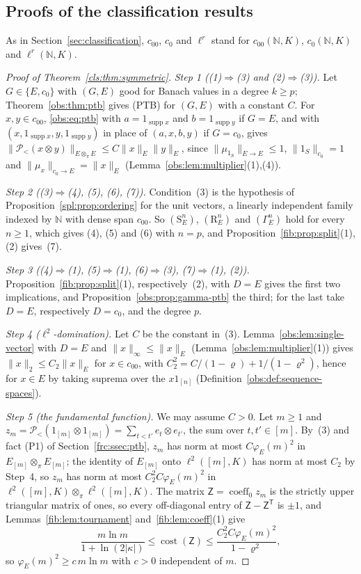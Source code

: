 \documentclass[11pt]{amsart}
\theoremstyle{definition}
\theoremstyle{remark}
\numberwithin{equation}{section}
\newcommand{\N}{\mathbb N}
\newcommand{\abs}[1]{\lvert #1\rvert}
\newcommand{\norm}[1]{\lVert #1\rVert}
\newcommand{\coeff}{\operatorname{coeff}}
\theoremstyle{plain}
\theoremstyle{definition}
\theoremstyle{plain}
\newcommand{\cP}{\mathcal P}
\begin{document}
\subsection{Proofs of the classification results}\label{frc:ssec:classification}
As in Section~\ref{sec:classification}, $c_{00}$, $c_0$ and $\ell^r$ stand for $c_{00}(\N,K)$, $c_0(\N,K)$ and
$\ell^r(\N,K)$.

\begin{proof}[Proof of Theorem~\ref{cls:thm:symmetric}]
\emph{Step 1 ((1)$\Rightarrow$(3) and (2)$\Rightarrow$(3)).} Let $G\in\{E,c_0\}$ with $(G,E)$ good for Banach values in
a degree $k\ge p$; Theorem~\ref{obs:thm:ptb} gives \textup{(PTB)} for $(G,E)$ with a constant $C$. For $x,y\in c_{00}$,
\eqref{obs:eq:ptb} with $a=1_{\operatorname{supp}x}$ and $b=1_{\operatorname{supp}y}$ if $G=E$, and with
$(x,1_{\operatorname{supp}x},y,1_{\operatorname{supp}y})$ in place of $(a,x,b,y)$ if $G=c_0$, gives
$\norm{\cP_<(x\otimes y)}_{E\otimes_\pi E}\le C\norm x_E\norm y_E$, since $\norm{\mu_{1_S}}_{E\to E}\le1$, $\norm{1_S}_{c_0}=1$
and $\norm{\mu_x}_{c_0\to E}=\norm x_E$ (Lemma~\ref{obs:lem:multiplier}(1),(4)).

\emph{Step 2 ((3)$\Rightarrow$(4), (5), (6), (7)).} Condition~(3) is the hypothesis of
Proposition~\ref{spl:prop:ordering} for the unit vectors, a linearly independent family indexed by $\N$ with dense span
$c_{00}$. So $(\mathrm S^n_E)$, $(\mathrm R^n_E)$ and $(\Gamma^n_E)$ hold for every $n\ge1$, which gives (4), (5) and (6) with
$n=p$, and Proposition~\ref{fib:prop:split}(1),(2) gives~(7).

\emph{Step 3 ((4)$\Rightarrow$(1), (5)$\Rightarrow$(1), (6)$\Rightarrow$(3), (7)$\Rightarrow$(1), (2)).}
Proposition~\ref{fib:prop:split}(1), respectively~(2), with $D=E$ gives the first two implications, and
Proposition~\ref{obs:prop:gamma-ptb} the third; for the last take $D=E$, respectively $D=c_0$, and the degree $p$.

\emph{Step 4 ($\ell^2$-domination).} Let $C$ be the constant in~(3). Lemma~\ref{obs:lem:single-vector} with $D=E$ and
$\norm x_\infty\le\norm x_E$ (Lemma~\ref{obs:lem:multiplier}(1)) gives $\norm x_2\le C_2\norm x_E$ for $x\in c_{00}$, with
$C_2^2=C/(1-\varrho)+1/(1-\varrho^2)$, hence for $x\in E$ by taking suprema over the $x1_{[n]}$
(Definition~\ref{obs:def:sequence-spaces}).

\emph{Step 5 (the fundamental function).} We may assume $C>0$. Let $m\ge1$ and
$z_m=\cP_<(1_{[m]}\otimes1_{[m]})=\sum_{t<t'}e_t\otimes e_{t'}$, the sum over $t,t'\in[m]$. By~(3) and fact (P1) of
Section~\ref{frc:ssec:ptb}, $z_m$ has norm at most $C\varphi_E(m)^2$ in $E_{[m]}\otimes_\pi E_{[m]}$; the identity of
$E_{[m]}$ onto $\ell^2([m],K)$ has norm at most $C_2$ by Step~4, so $z_m$ has norm at most $C_2^2C\varphi_E(m)^2$ in
$\ell^2([m],K)\otimes_\pi\ell^2([m],K)$. The matrix $\mathsf Z=\coeff_0z_m$ is the strictly upper triangular matrix of
ones, so every off-diagonal entry of $\mathsf Z-\mathsf Z^{\mathsf T}$ is $\pm1$, and Lemmas~\ref{fib:lem:tournament}
and~\ref{fib:lem:coeff}(1) give
\[
 \frac{m\ln m}{1+\ln(2\abs\kappa)}\le\operatorname{cost}(\mathsf Z)\le\frac{C_2^2C\varphi_E(m)^2}{1-\varrho^2},
\]
so $\varphi_E(m)^2\ge c\,m\ln m$ with $c>0$ independent of $m$.
\end{proof}
\end{document}
